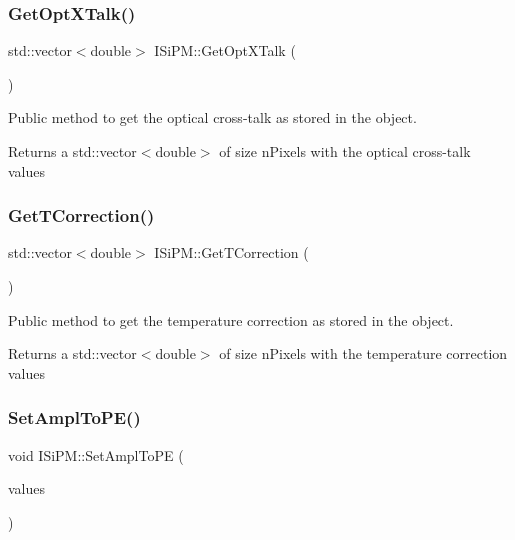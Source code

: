 \subsubsection{\texorpdfstring{Get\+Opt\+X\+Talk()}{GetOptXTalk()}}
{\footnotesize\ttfamily std\+::vector$<$double$>$ I\+Si\+P\+M\+::\+Get\+Opt\+X\+Talk (\begin{DoxyParamCaption}{ }\end{DoxyParamCaption})}



Public method to get the optical cross-\/talk as stored in the object. 

\begin{DoxyReturn}{Returns}
a std\+::vector$<$double$>$ of size n\+Pixels with the optical cross-\/talk values 
\end{DoxyReturn}
\mbox{\label{classISiPM_ac5dce66434f6fca0dfca279f4a157f30}} 
\subsubsection{\texorpdfstring{Get\+T\+Correction()}{GetTCorrection()}}
{\footnotesize\ttfamily std\+::vector$<$double$>$ I\+Si\+P\+M\+::\+Get\+T\+Correction (\begin{DoxyParamCaption}{ }\end{DoxyParamCaption})}



Public method to get the temperature correction as stored in the object. 

\begin{DoxyReturn}{Returns}
a std\+::vector$<$double$>$ of size n\+Pixels with the temperature correction values 
\end{DoxyReturn}
\mbox{\label{classISiPM_a232f9d00787139b7c972fa6834bc2a43}} 
\subsubsection{\texorpdfstring{Set\+Ampl\+To\+P\+E()}{SetAmplToPE()}}
{\footnotesize\ttfamily void I\+Si\+P\+M\+::\+Set\+Ampl\+To\+PE (\begin{DoxyParamCaption}\item[{std\+::vector$<$ double $>$}]{values }\end{DoxyParamCaption})}



